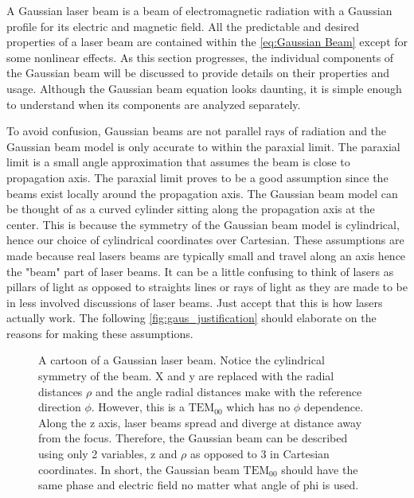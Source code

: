\documentclass[11pt,a4paper]{book}
\newcommand{\imginput}[1]{} %
\begin{document}
	A Gaussian laser beam is a beam of electromagnetic radiation with a Gaussian profile for its electric and magnetic field. All the predictable and desired properties of a laser beam are contained within the \autoref{eq:Gaussian Beam} except for some nonlinear effects. As this section progresses, the individual components of the Gaussian beam will be discussed to provide details on their properties and usage. Although the Gaussian beam equation looks daunting, it is simple enough to understand when its components are analyzed separately. 
	
	To avoid confusion, Gaussian beams are not parallel rays of radiation and the Gaussian beam model is only accurate to within the paraxial limit. The paraxial limit is a small angle approximation that assumes the beam is close to propagation axis. The paraxial limit proves to be a good assumption since the beams exist locally around the propagation axis. The Gaussian beam model can be thought of as a curved cylinder sitting along the propagation axis at the center. This is because the symmetry of the Gaussian beam model is cylindrical, hence our choice of cylindrical coordinates over Cartesian. These assumptions are made because real lasers beams are typically small and travel along an axis hence the "beam" part of laser beams. It can be a little confusing to think of lasers as pillars of light as opposed to straights lines or rays of light as they are made to be in less involved discussions of laser beams. Just accept that this is how lasers actually work. The following \autoref{fig:gaus_justification} should elaborate on the reasons for making these assumptions.

	\begin{figure} [!ht]
	\centering
	\def\svgwidth{\columnwidth}
	\resizebox{16cm}{!}{\imginput{images/gaus_justification.pdf_tex}}
	\caption{A cartoon of a Gaussian laser beam. Notice the cylindrical symmetry of the beam. X and y are replaced with the radial distances $\rho$ and the angle radial distances make with the reference direction $\phi$. However, this is a $\text{TEM}_{00}$ which has no $\phi$ dependence. Along the z axis, laser beams spread and diverge at distance away from the focus. Therefore, the Gaussian beam can be described using only 2 variables, z and $\rho$ as opposed to 3 in Cartesian coordinates. In short, the Gaussian beam $\text{TEM}_{00}$ should have the same phase and electric field no matter what angle of phi is used.} 
	\label{fig:gaus_justification}
	\end{figure}
			
\end{document}
